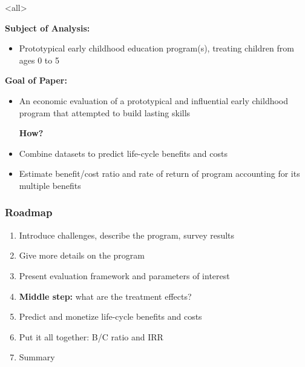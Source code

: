 \documentclass[static]{JJH-Beamer}
\begin{document}

\mode<all>{\theTitlePages} %

\begin{frame}

\begin{center}
\textbf{Subject of Analysis:}
\end{center}

\begin{itemize}
\item Prototypical early childhood education program(s), treating children from ages 0 to 5
\end{itemize}

\begin{center}
\textbf{Goal of Paper:}
\end{center}

\begin{itemize}
\item An economic evaluation of a prototypical and influential early childhood program that attempted to build lasting skills

\begin{center}
\textbf{How?}
\end{center}
\item Combine datasets to predict life-cycle benefits and costs
\item Estimate benefit/cost ratio and rate of return of program accounting for its multiple benefits
\end{itemize}

\end{frame}

\begin{frame}
\frametitle{Roadmap}

\begin{enumerate}
\item Introduce challenges, describe the program, survey results
\item Give more details on the program
\item Present evaluation framework and parameters of interest
\item \textbf{Middle step:} what are the treatment effects?
\item Predict and monetize life-cycle benefits and costs
\item Put it all together: B/C ratio and IRR
\item Summary
\end{enumerate}

\end{frame}
\end{document}
